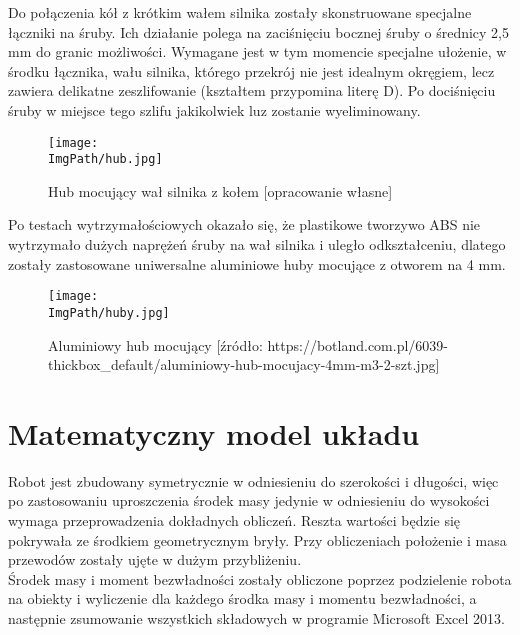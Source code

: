 \documentclass[a4paper,12pt,twoside,openany]{report}
\newcommand{\ImgPath}{.}
\begin{document}
Do połączenia kół z krótkim wałem silnika zostały skonstruowane specjalne łączniki na śruby. Ich działanie polega na zaciśnięciu bocznej śruby o średnicy 2,5 mm do granic możliwości. Wymagane jest w tym momencie specjalne ułożenie, w środku łącznika, wału silnika, którego przekrój nie jest idealnym okręgiem, lecz zawiera delikatne zeszlifowanie (kształtem przypomina literę D). Po dociśnięciu śruby w miejsce tego szlifu jakikolwiek luz zostanie wyeliminowany.

\begin{figure}[!htbp]
	\begin{center}
\centering
\texttt{[image: \\ImgPath/hub.jpg]}
\end{center}
	\caption{Hub mocujący wał silnika z kołem [opracowanie własne]}
	\label{schematKomunikacji}
\end{figure}

Po testach wytrzymałościowych okazało się, że plastikowe tworzywo ABS nie wytrzymało dużych naprężeń śruby na wał silnika i uległo odkształceniu, dlatego zostały zastosowane uniwersalne aluminiowe huby mocujące z otworem na 4 mm.

\begin{figure}[!htbp]
	\begin{center}
\centering
\texttt{[image: \\ImgPath/huby.jpg]}
\end{center}
	\caption{Aluminiowy hub mocujący [źródło: https://botland.com.pl/6039-thickbox\_default/aluminiowy-hub-mocujacy-4mm-m3-2-szt.jpg]}
	\label{schematKomunikacji}
\end{figure}

\section{Matematyczny model układu}

Robot jest zbudowany symetrycznie w odniesieniu do szerokości i długości, więc po zastosowaniu uproszczenia środek masy jedynie w odniesieniu do wysokości wymaga przeprowadzenia dokładnych obliczeń. Reszta wartości będzie się pokrywała ze środkiem geometrycznym bryły. Przy obliczeniach położenie i masa przewodów zostały ujęte w dużym przybliżeniu.\\

Środek masy i moment bezwładności zostały obliczone poprzez podzielenie robota na obiekty i wyliczenie dla każdego środka masy i momentu bezwładności, a następnie zsumowanie wszystkich składowych w programie Microsoft Excel 2013.
\end{document}
